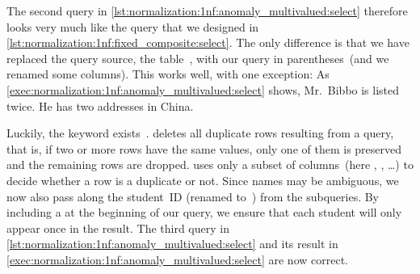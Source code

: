 The second query in \cref{lst:normalization:1nf:anomaly_multivalued:select} therefore looks very much like the query that we designed in \cref{lst:normalization:1nf:fixed_composite:select}.
The only difference is that we have replaced the query source, the table~, with our  query in parentheses~(and we renamed some columns).
This works well, with one exception:
As \cref{exec:normalization:1nf:anomaly_multivalued:select} shows, Mr.~Bibbo is listed twice.
He has two addresses in China.

Luckily, the  keyword exists~\cite{PGDG:PD:SC:S}.
 deletes all duplicate rows resulting from a query, that is, if two or more rows have the same values, only one of them is preserved and the remaining rows are dropped.
 uses only a subset of columns~(here , , \dots) to decide whether a row is a duplicate or not.
Since names may be ambiguous, we now also pass along the student~ID (renamed to~) from the subqueries.
By including a  at the beginning of our query, we ensure that each student will only appear once in the result.
The third query in \cref{lst:normalization:1nf:anomaly_multivalued:select} and its result in \cref{exec:normalization:1nf:anomaly_multivalued:select} are now correct.

